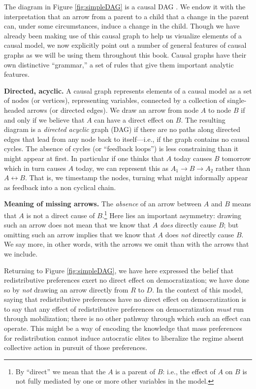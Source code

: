 \documentclass[
  12pt,
]{book}
\begin{document}
The diagram in Figure \ref{fig:simpleDAG} is a causal DAG \citep{hernan2006instruments}. We endow it with the interpretation that an arrow from a parent to a child that a change in the parent can, under some circumstances, induce a change in the child. Though we have already been making use of this causal graph to help us visualize elements of a causal model, we now explicitly point out a number of general features of causal graphs as we will be using them throughout this book. Causal graphs have their own distinctive ``grammar,'' a set of rules that give them important analytic features.

\textbf{Directed, acyclic.} A causal graph represents elements of a causal model as a set of nodes (or vertices), representing variables, connected by a collection of single-headed arrows (or directed edges). We draw an arrow from node \(A\) to node \(B\) if and only if we believe that \(A\) can have a direct effect on \(B\). The resulting diagram is a \emph{directed acyclic} graph (DAG) if there are no paths along directed edges that lead from any node back to itself---i.e., if the graph contains no causal cycles. The absence of cycles (or ``feedback loops'') is less constraining than it might appear at first. In particular if one thinks that \(A\) today causes \(B\) tomorrow which in turn causes \(A\) today, we can represent this as \(A_1 \rightarrow B \rightarrow A_2\) rather than \(A \leftrightarrow B\). That is, we timestamp the nodes, turning what might informally appear as feedback into a non cyclical chain.

\textbf{Meaning of missing arrows.} The \emph{absence} of an arrow between \(A\) and \(B\) means that \(A\) is not a direct cause of \(B\).\footnote{By ``direct'' we mean that the \(A\) is a parent of \(B\): i.e., the effect of \(A\) on \(B\) is not fully mediated by one or more other variables in the model.} Here lies an important asymmetry: drawing such an arrow does not mean that we know that \(A\) \emph{does} directly cause \(B\); but omitting such an arrow implies that we know that \(A\) does \emph{not} directly cause \(B\). We say more, in other words, with the arrows we omit than with the arrows that we include.

Returning to Figure \ref{fig:simpleDAG}, we have here expressed the belief that redistributive preferences exert no direct effect on democratization; we have done so by \emph{not} drawing an arrow directly from \(R\) to \(D\). In the context of this model, saying that redistributive preferences have no direct effect on democratization is to say that any effect of redistributive preferences on democratization \emph{must} run through mobilization; there is no other pathway through which such an effect can operate. This might be a way of encoding the knowledge that mass preferences for redistribution cannot induce autocratic elites to liberalize the regime absent collective action in pursuit of those preferences.
\end{document}
